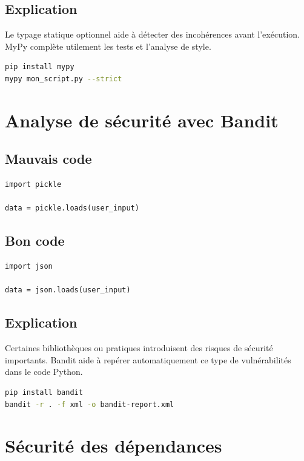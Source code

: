 \documentclass[a4paper,11pt]{report}
\begin{document}
\section{Explication}
Le typage statique optionnel aide à détecter des incohérences avant l'exécution.
MyPy complète utilement les tests et l'analyse de style.

\begin{lstlisting}[language=bash]
pip install mypy
mypy mon_script.py --strict
\end{lstlisting}

\chapter{Analyse de sécurité avec Bandit}

\section{Mauvais code}
\begin{lstlisting}
import pickle

data = pickle.loads(user_input)
\end{lstlisting}

\section{Bon code}
\begin{lstlisting}
import json

data = json.loads(user_input)
\end{lstlisting}

\section{Explication}
Certaines bibliothèques ou pratiques introduisent des risques de sécurité importants.
Bandit aide à repérer automatiquement ce type de vulnérabilités dans le code Python.

\begin{lstlisting}[language=bash]
pip install bandit
bandit -r . -f xml -o bandit-report.xml
\end{lstlisting}

\chapter{Sécurité des dépendances}
\end{document}
